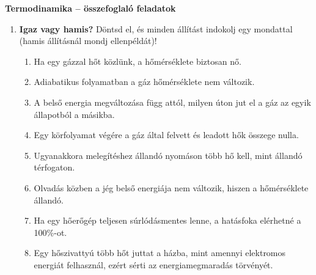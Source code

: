 \documentclass[11pt,a4paper]{article}
\begin{document}
\begin{center}
  {\Large\bfseries Termodinamika -- összefoglaló feladatok}\\[4pt]
\end{center}

\begin{enumerate}
\item \textbf{Igaz vagy hamis?} Döntsd el, és minden állítást indokolj egy mondattal (hamis
  állításnál mondj ellenpéldát)!
  \begin{enumerate}
    \item Ha egy gázzal hőt közlünk, a hőmérséklete biztosan nő.
    \item Adiabatikus folyamatban a gáz hőmérséklete nem változik.
    \item A belső energia megváltozása függ attól, milyen úton jut el a gáz az egyik
      állapotból a másikba.
    \item Egy körfolyamat végére a gáz által felvett és leadott hők összege nulla.
    \item Ugyanakkora melegítéshez állandó nyomáson több hő kell, mint állandó térfogaton.
    \item Olvadás közben a jég belső energiája nem változik, hiszen a hőmérséklete állandó.
    \item Ha egy hőerőgép teljesen súrlódásmentes lenne, a hatásfoka elérhetné a 100\%-ot.
    \item Egy hőszivattyú több hőt juttat a házba, mint amennyi elektromos energiát
      felhasznál, ezért sérti az energiamegmaradás törvényét.
  \end{enumerate}


\end{enumerate}
\end{document}

